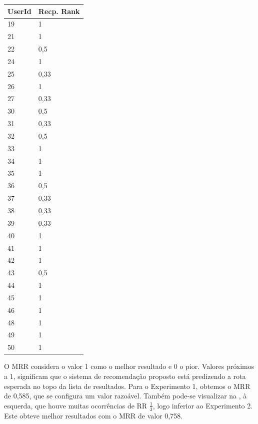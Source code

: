 \documentclass[portuguese]{textolivre}
\begin{document}
\begin{table}[htbp]
\begin{minipage}[t]{0.47\textwidth}
\begin{tabular}{ll}
\toprule
UserId & Recp. Rank \\
\midrule
19     & 1   \\
21     & 1      \\
22    & 0,5      \\
24     & 1       \\
25    & 0,33      \\
26    & 1       \\
27    & 0,33         \\
30    & 0,5       \\
31     & 0,33       \\
32    & 0,5          \\
33    & 1       \\
34     & 1      \\
35     & 1         \\
36     & 0,5      \\
37     & 0,33      \\
38     & 0,33      \\
39     & 0,33        \\
40     &  1        \\
41     &  1        \\
42     &  1        \\
43     &  0,5        \\
44     &  1        \\
45     &  1        \\
46     &  1        \\
48     &  1        \\
49     &  1        \\
50     &  1        \\
\bottomrule
\end{tabular}
\end{minipage}

\end{table}

O MRR considera o valor 1 como o melhor resultado e 0 o pior. Valores próximos a 1, significam que o sistema de recomendação proposto está predizendo a rota esperada no topo da lista de resultados. Para o Experimento 1, obtemos o MRR de 0,585, que se configura um valor razoável. Também pode-se visualizar na , à esquerda, que houve muitas ocorrências de RR $\frac{1}{3}$, logo inferior ao Experimento 2. Este obteve melhor resultados com o MRR de valor 0,758.
\end{document}
